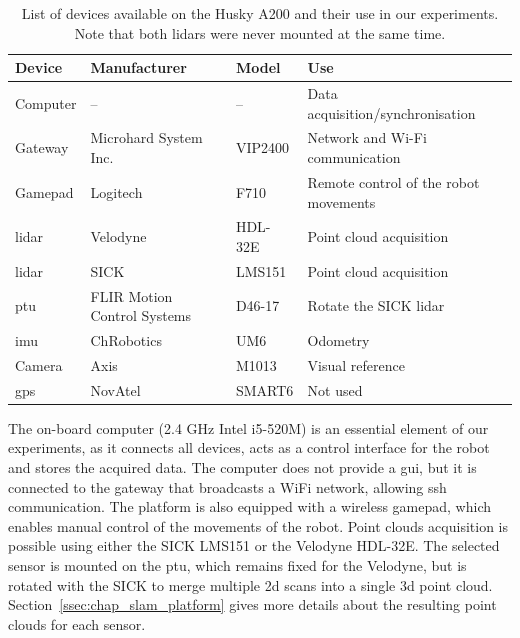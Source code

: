 \begin{table}[H]
    \centering
    \begin{tabular}{@{}llll@{}}
        \toprule
        \textbf{Device} & \textbf{Manufacturer}       & \textbf{Model}  & \textbf{Use}                          \\ \hline
        Computer        & --                          & --              & Data acquisition/synchronisation      \\
        Gateway         & Microhard System Inc.       & VIP2400         & Network and Wi-Fi communication       \\
        Gamepad         & Logitech                    & F710            & Remote control of the robot movements \\
        \gls*{lidar}    & Velodyne                    & HDL-32E         & Point cloud acquisition               \\
        \gls*{lidar}    & SICK                        & LMS151          & Point cloud acquisition               \\
        \gls*{ptu}      & FLIR Motion Control Systems & D46-17          & Rotate the SICK \gls*{lidar}          \\
        \gls*{imu}      & ChRobotics                  & UM6             & Odometry                              \\
        Camera          & Axis                        & M1013           & Visual reference                      \\
        \gls*{gps}      & NovAtel                     & SMART6          & Not used                              \\
        \bottomrule
    \end{tabular}
    \caption[List of devices available on the Husky A200 and their use in our experiments.]{List of devices available on the Husky A200 and their use in our experiments. Note that both \gls*{lidar}s were never mounted at the same time.}
    \label{tab:husky_devices}
\end{table}

The on-board computer (2.4 GHz Intel i5-520M) is an essential element of our experiments, as it connects all devices, acts as a control interface for the robot and stores the acquired data. The computer does not provide a \gls*{gui}, but it is connected to the gateway that broadcasts a WiFi network, allowing \gls*{ssh} communication. The platform is also equipped with a wireless gamepad, which enables manual control of the movements of the robot. Point clouds acquisition is possible using either the SICK LMS151 or the Velodyne HDL-32E. The selected sensor is mounted on the \gls*{ptu}, which remains fixed for the Velodyne, but is rotated with the SICK to merge multiple \gls*{2d} scans into a single \gls*{3d} point cloud. Section~\ref{ssec:chap_slam_platform} gives more details about the resulting point clouds for each sensor.


